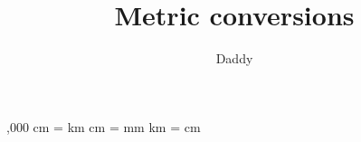 \documentclass[12pt, legalpaper]{exam}
\begin{document}
\title {Metric conversions}
\author{ Daddy }
\maketitle

\begin{questions}
,000 cm = \fillin km
\vspace*{.5in}
 cm = \fillin mm
\vspace*{.5in}
 km = \fillin cm
\vspace*{.5in}
\end{questions}
\vfill
\end{document}
